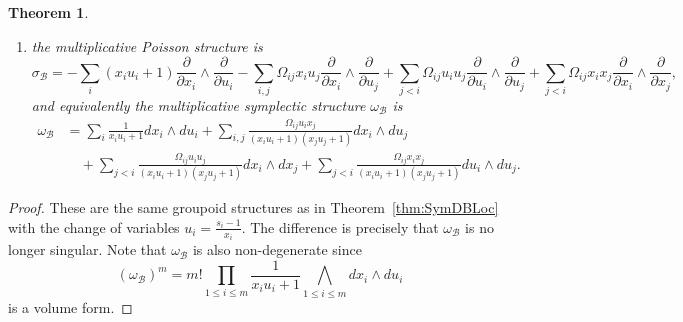 \documentclass{amsart}
\newtheorem{theorem}{Theorem}[section]
\numberwithin{equation}{section}
\newcommand{\cB}{\mathcal{B}}
\begin{document}
\begin{theorem}
\begin{enumerate}
        where $u''_j = \left( u'_j (x_ju_j+1) \prod_{i=1}^m (x_iu_i+1)^{\Omega_{ij}} + u_j \right)$;
    \item the multiplicative Poisson structure is
    \begin{equation*}
	\sigma_\cB = -\sum_{i} (x_i u_i + 1) \frac{\partial}{\partial x_i} \wedge \frac{\partial}{\partial u_i} - \sum_{i, j} \Omega_{ij}x_i u_j \frac{\partial}{\partial x_i} \wedge \frac{\partial}{\partial u_j} +\sum_{j < i} \Omega_{ij}u_iu_j \frac{\partial}{\partial u_i} \wedge \frac{\partial}{\partial u_j} + \sum_{j < i} \Omega_{ij}x_ix_j \frac{\partial}{\partial x_i} \wedge \frac{\partial}{\partial x_j},
    \end{equation*}
    and equivalently the multiplicative symplectic structure $\omega_\cB$ is
    \begin{align*} 
	\omega_\cB & = \sum_{i} \frac{1}{x_iu_i+1}dx_i \wedge du_i + \sum_{i, j} \frac{\Omega_{ij}u_ix_j}{(x_iu_i+1)(x_ju_j+1)}  dx_i \wedge du_j \\
	& \quad + \sum_{j < i}\frac{\Omega_{ij}u_iu_j}{(x_iu_i+1)(x_ju_j+1)}  dx_i \wedge dx_j + \sum_{j < i} \frac{\Omega_{ij}x_ix_j}{(x_iu_i+1)(x_ju_j+1)}  du_i \wedge du_j.
      \end{align*}
  \end{enumerate}
\end{theorem}

\begin{proof}
  These are the same groupoid structures as in Theorem~\ref{thm:SymDBLoc} with the change of variables $u_i = \frac{s_i-1}{x_i}$.
  The difference is precisely that $\omega_\cB$ is no longer singular.
  Note that $\omega_\cB$ is also non-degenerate since
  \[(\omega_\cB)^m = m!  \prod_{1\leq i\leq m} \frac{1}{x_iu_i+1} \bigwedge\limits_{1\leq i\leq m} dx_i \wedge du_i\]
  is a volume form.
\end{proof}
\end{document}
